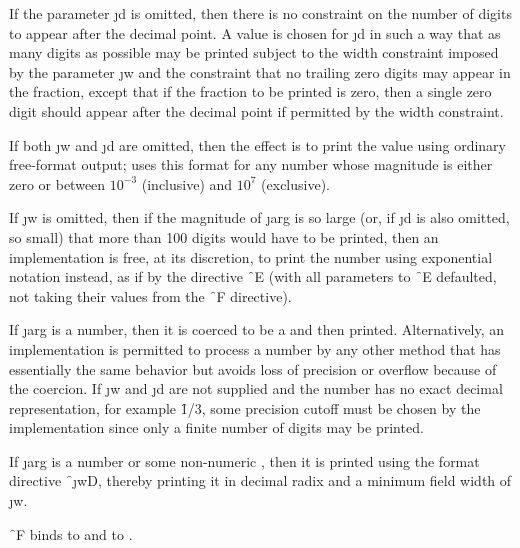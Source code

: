 If the parameter \j{d} is omitted, then there is no constraint
on the number of digits to appear after the decimal point.
A value is chosen for \j{d} in such a way that as many digits
as possible may be printed subject to the width constraint
imposed by the parameter \j{w} and the constraint that no trailing
zero digits may appear in the fraction, except that if the
fraction to be printed is zero, then a single zero digit should
appear after the decimal point if permitted by the width constraint.

If both \j{w} and \j{d} are omitted, then the effect is to print
the value using ordinary free-format output;  uses this format
for any number whose magnitude is either zero or between
$10^{-3}$ (inclusive) and $10^7$ (exclusive).

If \j{w} is omitted, then if the magnitude of \j{arg} is so large (or, if
\j{d} is also omitted, so small) that more than 100 digits would have to
be printed, then an implementation is free, at its discretion, to print
the number using exponential notation instead, as if by the directive
\f{~E} (with all parameters to \f{~E} defaulted, not
taking their values from the \f{~F} directive).

If \j{arg} is a  
number, then it is coerced to be a 
and then printed.  Alternatively, an implementation is permitted to
process a  
number by any other method that has essentially the
same behavior but avoids loss of precision or overflow
because of the coercion.  If \j{w} and \j{d} are
not supplied and the number has no exact decimal representation,
for example \f{1/3}, some precision cutoff must be chosen
by the implementation since only a finite number of digits may be printed.

If \j{arg} is a  number or some non-numeric
, 
then it is printed using the format directive \f{~\j{w}D},
thereby printing it in decimal radix and a minimum field width of \j{w}.

\f{~F} binds
     to 
 and  to .

\endsubsubsection%


